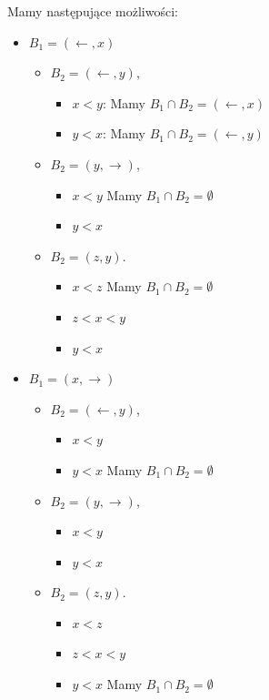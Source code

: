 \begin{eg}[1.2.8 $T(<)$]
Mamy następujące możliwości:
\begin{itemize}
	\item $B_{1} = \left( \leftarrow ,x \right) $
		\begin{itemize}
			\item $B_2 = \left( \leftarrow , y \right) $,
				\begin{itemize}
					\item $x<y$: Mamy $ B_1\cap B_2 = \left( \leftarrow ,x \right) $
					\item $y<x$: Mamy $ B_1\cap B_2 = \left( \leftarrow , y \right) $
				\end{itemize}
			\item $B_2 = \left( y, \rightarrow  \right) $,
				\begin{itemize}
					\item $x<y$ Mamy $ B_1\cap B_2 =\emptyset$
					\item $y<x$
				\end{itemize}
			\item $B_2 = \left( z,y \right) $.
				\begin{itemize}
					\item $x<z$ Mamy $ B_1\cap B_2 =\emptyset$
					\item $z<x<y$
					\item $y<x$
				\end{itemize}
		\end{itemize}
	\item $B_1 = \left( x, \rightarrow  \right) $
		\begin{itemize}
			\item $B_2 = \left( \leftarrow , y \right) $,
				\begin{itemize}
					\item $x<y$
					\item $y<x$ Mamy $ B_1\cap B_2 = \emptyset$
				\end{itemize}
			\item $B_2 = \left( y, \rightarrow  \right) $,
				\begin{itemize}
					\item $x<y$
					\item $y<x$
				\end{itemize}
			\item $B_2 = \left( z,y \right) $.
				\begin{itemize}
					\item $x<z$
					\item $z<x<y$
					\item $y<x$ Mamy $ B_1\cap B_2 =\emptyset$
				\end{itemize}


\end{itemize}
\end{itemize}
\end{eg}
